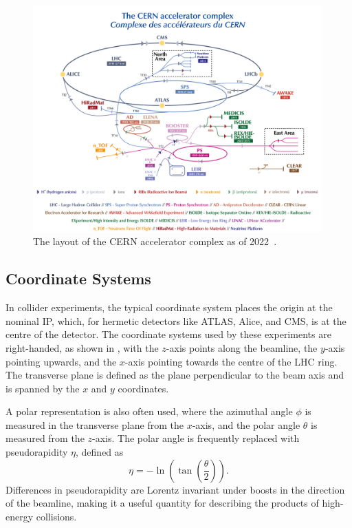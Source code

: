 \begin{figure}
    \centering
    \includegraphics[width=0.99\textwidth]{Figures/cern_atlas/complex.png}
    \caption{The layout of the CERN accelerator complex as of 2022~\cite{CERNAC}.}
    \label{fig:cern_accelerator_complex}
\end{figure}

\subsection{Coordinate Systems}

In collider experiments, the typical coordinate system places the origin at the nominal IP, which, for hermetic detectors like ATLAS, Alice, and CMS, is at the centre of the detector.
The coordinate systems used by these experiments are right-handed, as shown in , with the $z$-axis points along the beamline, the $y$-axis pointing upwards, and the $x$-axis pointing towards the centre of the LHC ring.
The transverse plane is defined as the plane perpendicular to the beam axis and is spanned by the $x$ and $y$ coordinates.

A polar representation is also often used, where the azimuthal angle $\phi$ is measured in the transverse plane from the $x$-axis, and the polar angle $\theta$ is measured from the $z$-axis.
The polar angle is frequently replaced with pseudorapidity $\eta$, defined as
\begin{equation}
    \eta = -\ln \left( \tan \left( \frac{\theta}{2} \right) \right).
\end{equation}
Differences in pseudorapidity are Lorentz invariant under boosts in the direction of the beamline, making it a useful quantity for describing the products of high-energy collisions.


